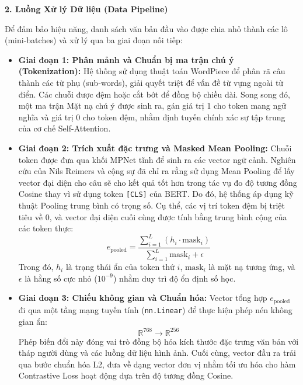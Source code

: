 \textbf{2. Luồng Xử lý Dữ liệu (Data Pipeline)}

Để đảm bảo hiệu năng, danh sách văn bản đầu vào được chia nhỏ thành các lô (mini-batches) và xử lý qua ba giai đoạn nối tiếp:

\begin{itemize}
    \item \textbf{Giai đoạn 1: Phân mảnh và Chuẩn bị ma trận chú ý (Tokenization):} Hệ thống sử dụng thuật toán WordPiece để phân rã câu thành các từ phụ (sub-words), giải quyết triệt để vấn đề từ vựng ngoài từ điển. Các chuỗi được đệm hoặc cắt bớt để đồng bộ chiều dài. Song song đó, một ma trận Mặt nạ chú ý được sinh ra, gán giá trị 1 cho token mang ngữ nghĩa và giá trị 0 cho token đệm, nhằm định tuyến chính xác sự tập trung của cơ chế Self-Attention.
    
    \item \textbf{Giai đoạn 2: Trích xuất đặc trưng và Masked Mean Pooling:} Chuỗi token được đưa qua khối MPNet tĩnh để sinh ra các vector ngữ cảnh. Nghiên cứu của Nils Reimers và cộng sự \cite{43} đã chỉ ra rằng sử dụng Mean Pooling để lấy vector đại diện cho câu sẽ cho kết quả tốt hơn trong tác vụ đo độ tương đồng Cosine thay vì sử dụng token \texttt{[CLS]} của BERT. Do đó, hệ thống áp dụng kỹ thuật Pooling trung bình có trọng số. Cụ thể, các vị trí token đệm bị triệt tiêu về 0, và vector đại diện cuối cùng được tính bằng trung bình cộng của các token thực:
    \begin{equation}
        e_{\text{pooled}} = \frac{\sum_{i=1}^{L} (h_i \cdot \text{mask}_i)}{\sum_{i=1}^{L} \text{mask}_i + \epsilon}
    \end{equation}
    Trong đó, $h_i$ là trạng thái ẩn của token thứ $i$, $\text{mask}_i$ là mặt nạ tương ứng, và $\epsilon$ là hằng số cực nhỏ ($10^{-9}$) nhằm duy trì độ ổn định số học.
    
    \item \textbf{Giai đoạn 3: Chiếu không gian và Chuẩn hóa:} Vector tổng hợp $e_{\text{pooled}}$ đi qua một tầng mạng tuyến tính (\texttt{nn.Linear}) để thực hiện phép nén không gian ẩn:
    \begin{equation}
        \mathbb{R}^{768} \rightarrow \mathbb{R}^{256}
    \end{equation}
    Phép biến đổi này đóng vai trò đồng bộ hóa kích thước đặc trưng văn bản với tháp người dùng và các luồng dữ liệu hình ảnh. Cuối cùng, vector đầu ra trải qua bước chuẩn hóa L2, đưa về dạng vector đơn vị nhằm tối ưu hóa cho hàm Contrastive Loss hoạt động dựa trên độ tương đồng Cosine.
\end{itemize}

